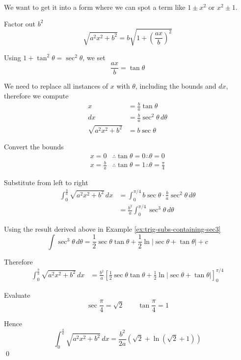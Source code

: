 \begin{solution}
    We want to get it into a form where we can spot a term like $1 \pm x^2$ or $x^2 \pm 1$.

    Factor out $b^2$
    \[
        \sqrt{a^2x^2+b^2}=b\sqrt{1+\left(\frac{ax}{b}\right)^2}
    \]

    Using $1+\tan^2\theta=\sec^2\theta$, we set
    \[
        \frac{ax}{b}=\tan\theta
    \]

    We need to replace all instances of $x$ with $\theta$, including the bounds and $dx$, therefore we compute
    \begin{align*}
        x &= \frac{b}{a}\tan\theta\\
        dx &= \frac{b}{a}\sec^2\theta\,d\theta\\
        \sqrt{a^2x^2+b^2} &= b\sec\theta
    \end{align*}

    Convert the bounds
    \begin{align*}
        x=0 &\therefore \tan\theta=0 \therefore \theta=0\\
        x=\frac{b}{a} &\therefore \tan\theta=1 \therefore \theta=\frac{\pi}{4}
    \end{align*}

    Substitute from left to right
    \begin{align*}
        \int_{0}^{\frac{b}{a}}\sqrt{a^2x^2+b^2}\,dx
        &= \int_{0}^{\pi/4} b\sec\theta\cdot\frac{b}{a}\sec^2\theta\,d\theta\\
        &= \frac{b^2}{a}\int_{0}^{\pi/4}\sec^3\theta\,d\theta
    \end{align*}

    Using the result derived above in Example \ref{ex:trig-subs-containing-sec3}
    \[
        \int \sec^3\theta\,d\theta
        = \frac{1}{2}\sec\theta\tan\theta+\frac{1}{2}\ln|\sec\theta+\tan\theta|+c
    \]

    Therefore
    \begin{align*}
        \int_{0}^{\frac{b}{a}}\sqrt{a^2x^2+b^2}\,dx
        &= \frac{b^2}{a}\left[\frac{1}{2}\sec\theta\tan\theta+\frac{1}{2}\ln|\sec\theta+\tan\theta|\right]_{0}^{\pi/4}
    \end{align*}

    Evaluate
    \[
        \sec\frac{\pi}{4}=\sqrt{2}
        \qquad
        \tan\frac{\pi}{4}=1
    \]

    Hence
    \[
        \int_{0}^{\frac{b}{a}}\sqrt{a^2x^2+b^2}\,dx
        = \frac{b^2}{2a}\left(\sqrt{2}+\ln(\sqrt{2}+1)\right)
    \]
    \qed
\end{solution}

